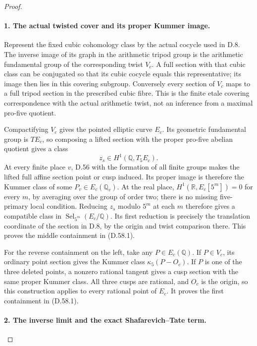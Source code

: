 \begin{proof}
\paragraph{1. The actual twisted cover and its proper Kummer image.}

Represent the fixed cubic cohomology class by the actual cocycle
used in D.8.  The inverse image of its graph in the arithmetic
tripod group is the arithmetic fundamental group of the
corresponding twist $V_c$.  A full section with that cubic
class can be conjugated so that its cubic cocycle equals this
representative; its image then lies in this covering subgroup.
Conversely every section of $V_c$ maps to a full tripod section
in the prescribed cubic fibre.  This is the finite etale
covering correspondence with the actual arithmetic twist,
not an inference from a maximal pro-five quotient.

Compactifying $V_c$ gives the pointed elliptic curve $E_c$.
Its geometric fundamental group is $TE_c$, so composing a
lifted section with the proper pro-five abelian quotient
gives a class
\[
                         z_s\in H^1(\mathbb Q,T_5E_c).
\]
At every finite place $v$, D.56 with the formation of all
finite groups makes the lifted full affine section point
or cusp induced.  Its proper image is therefore the Kummer
class of some $P_v\in E_c(\mathbb Q_v)$.  At the real place,
$H^1(\mathbb R,E_c[5^m])=0$ for every $m$, by averaging over
the group of order two; there is no missing five-primary
local condition.  Reducing $z_s$ modulo $5^m$ at each $m$
therefore gives a compatible class in
$\operatorname{Sel}_{5^m}(E_c/\mathbb Q)$.
Its first reduction is precisely the translation coordinate
of the section in D.8, by the origin and twist comparison
there.  This proves the middle containment in (D.58.1).

For the reverse containment on the left, take any
$P\in E_c(\mathbb Q)$.  If $P\in V_c$, its ordinary point
section gives the Kummer class $\kappa_5(P-O_c)$.  If $P$
is one of the three deleted points, a nonzero rational
tangent gives a cusp section with the same proper Kummer
class.  All three cusps are rational, and $O_c$ is the
origin, so this construction applies to every rational
point of $E_c$.  It proves the first containment in (D.58.1).

\paragraph{2. The inverse limit and the exact Shafarevich--Tate term.}


\end{proof}

